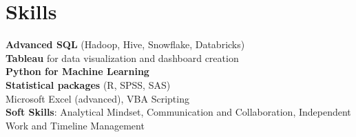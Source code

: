 \section{Skills}
  \begin{itemize}[leftmargin=0.1in, label={}]
    \normalsize{\item{
      \textbf{Advanced SQL} (Hadoop, Hive, Snowflake, Databricks) \\
      \textbf{Tableau} for data visualization and dashboard creation \\
      \textbf{Python for Machine Learning} \\
      \textbf{Statistical packages} (R, SPSS, SAS) \\
      Microsoft Excel (advanced), VBA Scripting \\
      \textbf{Soft Skills}: Analytical Mindset, Communication and Collaboration, Independent Work and Timeline Management \\
     }}
  \end{itemize}
